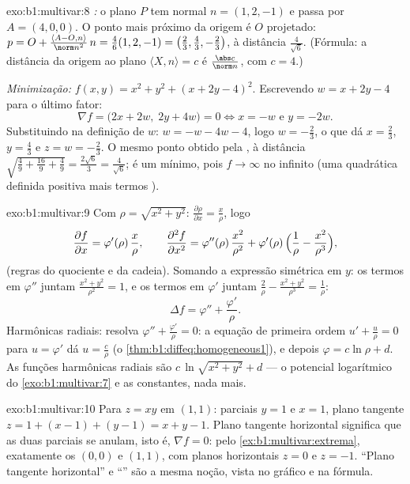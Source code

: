 \begin{solution}{exo:b1:multivar:8}
\emph{:} o plano $P$ tem normal $n = (1, 2, -1)$ e passa por $A = (4, 0, 0)$. O
ponto mais próximo da origem é $O$ projetado: $p = O + \frac{\langle A - O, n\rangle}{\norm
n^2}\,n = \frac{4}{6}(1,2,-1) = \bigl(\frac23, \frac43,
-\frac23\bigr)$, à distância
$\frac{4}{\sqrt 6}$. (Fórmula: a distância da origem ao plano $\langle X, n \rangle = c$ é $\frac{\abs c}{\norm n}$, com
$c = 4$.)

\emph{Minimização:} $f(x,y) = x^2 + y^2 + (x + 2y - 4)^2$. Escrevendo $w = x + 2y - 4$ para o último fator:
\[
\nabla f = \bigl(2x + 2w,\; 2y + 4w\bigr) = 0
\iff x = -w \text{ e } y = -2w .
\]
Substituindo na definição de $w$: $w = -w - 4w - 4$, logo $w =
-\frac23$, o que dá $x = \frac23$,
$y = \frac43$ e $z = w =
-\frac23$. O mesmo ponto obtido pela , à distância $\sqrt{\frac49 + \frac{16}{9} + \frac49} = \frac{2\sqrt 6}{3} =
\frac{4}{\sqrt6}$;
é um mínimo, pois $f \to \infty$ no infinito (uma quadrática definida positiva
mais termos ).
\end{solution}

\begin{solution}{exo:b1:multivar:9}
Com $\rho = \sqrt{x^2+y^2}$: $\frac{\partial \rho}{\partial x} =
\frac{x}{\rho}$, logo
\[
\frac{\partial f}{\partial x} = \varphi'(\rho)\,\frac{x}{\rho},
\qquad
\frac{\partial^2 f}{\partial x^2}
= \varphi''(\rho)\,\frac{x^2}{\rho^2}
+ \varphi'(\rho)\,\Bigl(\frac{1}{\rho} -
\frac{x^2}{\rho^3}\Bigr),
\]
(regras do quociente e da cadeia). Somando a expressão simétrica em
$y$: os termos em $\varphi''$ juntam $\frac{x^2 + y^2}{\rho^2} = 1$, e os termos em $\varphi'$ juntam
$\frac{2}{\rho} - \frac{x^2 +
y^2}{\rho^3} = \frac{1}{\rho}$:
\[
\Delta f = \varphi'' + \frac{\varphi'}{\rho} .
\]
Harmônicas radiais: resolva $\varphi'' + \frac{\varphi'}{\rho} = 0$: a equação de primeira ordem $u' + \frac u\rho = 0$
para $u = \varphi'$ dá $u = \frac{c}{\rho}$ (o \cref{thm:b1:diffeq:homogeneous1}), e depois $\varphi = c\ln\rho + d$. As funções harmônicas
radiais são $c\,\ln\sqrt{x^2 + y^2} + d$ --- o potencial logarítmico do \cref{exo:b1:multivar:7} e as
constantes, nada mais.
\end{solution}

\begin{solution}{exo:b1:multivar:10}
Para $z = xy$ em $(1,1)$: parciais $y = 1$ e $x = 1$, plano tangente
$z = 1 + (x - 1) + (y - 1) = x + y - 1$. Plano tangente horizontal significa que as duas parciais se
anulam, isto é, $\nabla f = 0$: pelo \cref{ex:b1:multivar:extrema}, exatamente os 
$(0, 0)$ e $(1, 1)$, com planos horizontais $z = 0$ e $z = -1$.
``Plano tangente horizontal'' e ``'' são a mesma noção,
vista no gráfico e na fórmula.
\end{solution}

